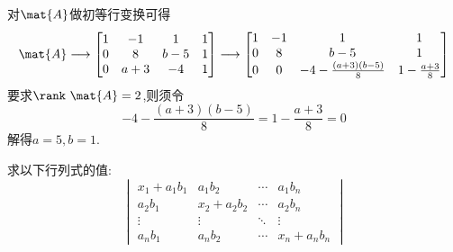 \documentclass{ctexart}
\begin{document}
\begin{solution}
    对$\mat{A}$做初等行变换可得
    \[\mat{A}\longrightarrow\begin{bmatrix}
        1&-1&1&1\\
        0&8&b-5&1\\
        0&a+3&-4&1
    \end{bmatrix}\longrightarrow\begin{bmatrix}
        1&-1&1&1\\
        0&8&b-5&1\\
        0&0&-4-\frac{(a+3)(b-5)}{8}&1-\frac{a+3}{8}
    \end{bmatrix}\]
    要求$\rank\ \mat{A}=2$,则须令
    \[-4-\frac{(a+3)(b-5)}{8}=1-\frac{a+3}{8}=0\]
    解得$a=5,b=1$.
\end{solution}
\begin{homework}[9]
    求以下行列式的值:
    \[\begin{vmatrix}
        x_1+a_1b_1&a_1b_2&\cdots&a_1b_n\\
        a_2b_1&x_2+a_2b_2&\cdots&a_2b_n\\
        \vdots&\vdots&\ddots&\vdots\\
        a_nb_1&a_nb_2&\cdots&x_n+a_nb_n
    \end{vmatrix}\]
\end{homework}
\end{document}

